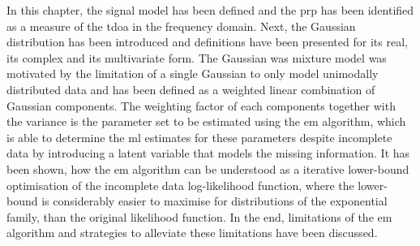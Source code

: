 \bigskip

In this chapter, the signal model has been defined and the \gls{prp} has been identified as a measure of the \gls{tdoa} in the frequency domain. Next, the Gaussian distribution has been introduced and definitions have been presented for its real, its complex and its multivariate form. The Gaussian was mixture model was motivated by the limitation of a single Gaussian to only model unimodally distributed data and has been defined as a weighted linear combination of Gaussian components. The weighting factor of each components together with the variance is the parameter set to be estimated using the \gls{em} algorithm, which is able to determine the \gls{ml} estimates for these parameters despite incomplete data by introducing a latent variable that models the missing information. It has been shown, how the \gls{em} algorithm can be understood as a iterative lower-bound optimisation of the incomplete data log-likelihood function, where the lower-bound is considerably easier to maximise for distributions of the exponential family, than the original likelihood function. In the end, limitations of the \gls{em} algorithm and strategies to alleviate these limitations have been discussed.